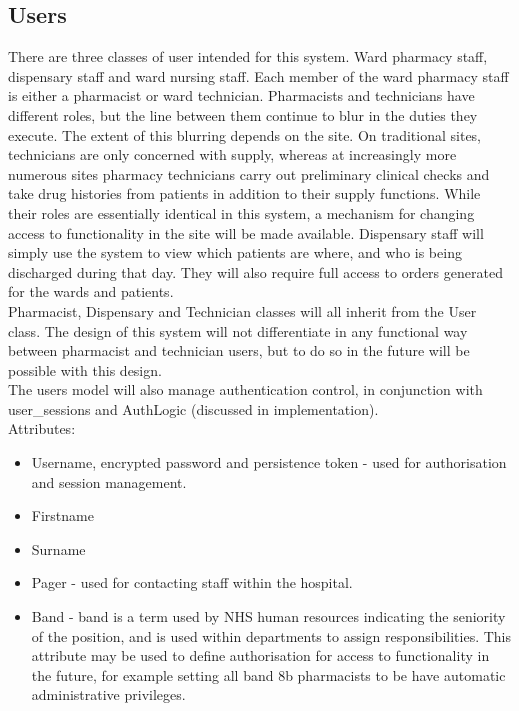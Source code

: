 \documentclass[letterpaper]{amsart}
\begin{document}
\subsection{Users}
There are three classes of user intended for this system.  Ward pharmacy staff, dispensary staff and ward nursing staff.  Each member of the ward pharmacy staff is either a pharmacist or ward technician.  Pharmacists and technicians have different roles, but the line between them continue to blur in the duties they execute.  The extent of this blurring depends on the site.  On traditional sites, technicians are only concerned with supply, whereas at increasingly more numerous sites pharmacy technicians carry out preliminary clinical checks and take drug histories from patients in addition to their supply functions.  While their roles are essentially identical in this system, a mechanism for changing access to functionality in the site will be made available.  Dispensary staff will simply use the system to view which patients are where, and who is being discharged during that day.  They will also require full access to orders generated for the wards and patients. \\ 
Pharmacist, Dispensary and Technician classes will all inherit from the User class. The design of this system will not differentiate in any functional way between pharmacist and technician users, but to do so in the future will be possible with this design.\\
The users model will also manage authentication control, in conjunction with user\_sessions and AuthLogic (discussed in implementation).\\
Attributes:
\begin{itemize}
    \item Username, encrypted password and persistence token - used for authorisation and session management.
    \item Firstname 
    \item Surname 
    \item Pager - used for contacting staff within the hospital.
    \item Band - band is a term used by NHS human resources indicating the seniority of the position, and is used within departments to assign responsibilities.  This attribute may be used to define authorisation for access to functionality in the future, for example setting all band 8b pharmacists to be have automatic administrative privileges. 
\end{itemize}
\end{document}
